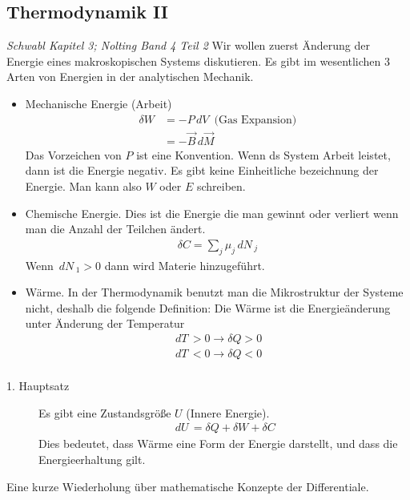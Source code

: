 \documentclass[11pt]{article}
\theoremstyle{plain}
\theoremstyle{mytheoremstyle}
\renewcommand{\d}[1]{\,d#1\,}
\begin{document}
\subsection*{Thermodynamik II}
\emph{Schwabl Kapitel 3; Nolting Band 4 Teil 2}
Wir wollen zuerst \"Anderung der Energie eines makroskopischen Systems diskutieren.
Es gibt im wesentlichen 3 Arten von Energien in der analytischen Mechanik.

\begin{itemize}
  \item Mechanische Energie (Arbeit)
    \begin{align*}
      \delta W & = - P \d{V} \text{ (Gas Expansion)} \\
               & = - \vec{B} \d{\vec{M}}
    \end{align*}
    Das Vorzeichen von $P$ ist eine Konvention. Wenn ds System Arbeit leistet,
    dann ist die Energie negativ.
    Es gibt keine Einheitliche bezeichnung der Energie. Man kann also 
    $W$ oder $E$ schreiben.
    
  \item  Chemische Energie. Dies ist die Energie die man gewinnt oder verliert
    wenn man die Anzahl der Teilchen \"andert.
    \begin{align*}
      \delta C = \sum_{j}^{} \mu_j \d{N}_j
    \end{align*}
    Wenn $ \d{N}_1 > 0$ dann wird Materie hinzugeführt.
  \item Wärme. In der Thermodynamik benutzt man die Mikrostruktur der Systeme
    nicht, deshalb die folgende Definition: Die Wärme ist die Energieänderung
    unter Änderung der Temperatur
    \begin{align*}
      \d{T} > 0 \to \delta Q > 0 \\
      \d{T} < 0 \to \delta Q < 0 \\
    \end{align*}
\end{itemize}
\begin{description}
  \item[1. Hauptsatz] Es gibt eine Zustandsgr\"o\ss{}e $U$ (Innere Energie).
    \begin{align*}
      \d{U} = \delta Q + \delta W + \delta C
    \end{align*}
    Dies bedeutet, dass W\"arme eine Form der Energie darstellt, und
    dass die Energieerhaltung gilt.
\end{description}
Eine kurze Wiederholung \"uber mathematische Konzepte der Differentiale.
\end{document}
